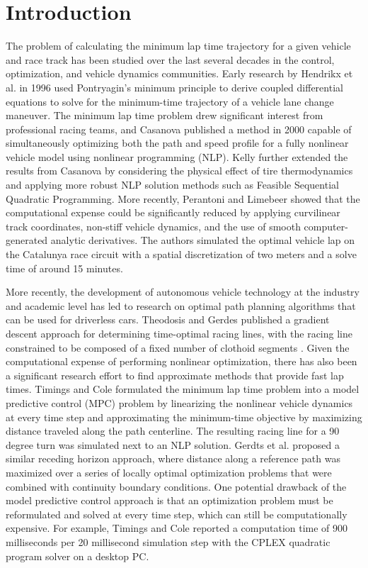\documentclass[twocolumn,10pt]{asme2ej}
\begin{document}
\section{Introduction}
The problem of calculating the minimum lap time trajectory for a given vehicle and race track has been studied over the last several decades
in the control, optimization, and vehicle dynamics communities.  Early research by Hendrikx et al. \cite{hendrikx} in 1996 used 
 Pontryagin's minimum principle to derive coupled differential equations to solve for the minimum-time trajectory
of a vehicle lane change maneuver. The minimum lap time problem drew significant interest from professional racing teams, and
Casanova \cite{casanova} published a method in 2000 capable of simultaneously optimizing both the path and speed profile
for a fully nonlinear vehicle model using nonlinear programming (NLP). Kelly \cite{kelly} further extended the results from Casanova by considering
the physical effect of tire thermodynamics and applying more robust NLP solution methods such as Feasible Sequential Quadratic Programming. More recently,
Perantoni and Limebeer \cite{perantoni} showed that the computational expense could be significantly reduced by 
applying curvilinear track coordinates, non-stiff vehicle dynamics, and the use of smooth computer-generated
analytic derivatives. The authors simulated the optimal vehicle lap on the Catalunya race circuit with a spatial discretization
of two meters and a solve time of around 15 minutes. 

More recently, the development of autonomous vehicle technology at the industry and academic level has led to research on optimal path
 planning algorithms that can be used for driverless cars. Theodosis and Gerdes published a gradient descent approach for determining time-optimal
  racing lines, with the racing line constrained to be composed of a fixed number of clothoid segments \cite{theodosis}. Given the computational expense
 of performing nonlinear optimization, there has also been a significant research effort to find approximate methods that provide fast lap times.
 Timings and Cole \cite{timings} formulated the minimum lap time problem into a model predictive control (MPC) problem by linearizing the nonlinear vehicle
 dynamics at every time step and approximating the minimum-time objective by maximizing distance traveled along the path centerline. The resulting racing line
 for a 90 degree turn was simulated next to an NLP solution. Gerdts et al.  \cite{gerdts} proposed a similar receding horizon approach, where distance along a reference path was maximized over a series of locally optimal optimization
 problems that were combined with continuity boundary conditions. One potential drawback of the model predictive control approach is that an optimization
 problem must be reformulated and solved at every time step, which can still be computationally expensive. For example, Timings and Cole reported a computation time of 900 milliseconds
 per 20 millisecond simulation step with the CPLEX quadratic program solver on a desktop PC.
\end{document}
